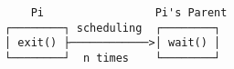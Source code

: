\documentclass[varwidth,crop]{standalone}
\begin{document}
\begin{verbatim}
    Pi                 Pi's Parent
┌────────┐ scheduling  ┌────────┐
│ exit() ├────────────>│ wait() │
└────────┘  n times    └────────┘
\end{verbatim}
\end{document}
